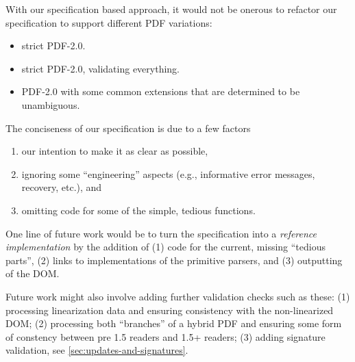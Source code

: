With our specification based approach, it would not be onerous
to refactor our specification to support different PDF variations:
\begin{itemize}
\item strict PDF-2.0.
\item strict PDF-2.0, validating everything.
\item PDF-2.0 with some common extensions that are determined to be unambiguous.
\end{itemize}

The conciseness of our specification is due to a few factors
\begin{enumerate}
\item our intention to make it as clear as possible,
\item ignoring some ``engineering'' aspects (e.g., informative error
   messages, recovery, etc.), and
\item omitting code for some of the simple, tedious functions.
\end{enumerate}
One line of future work would be to turn the specification into a
\emph{reference implementation} by the addition of
(1) code for the current, missing ``tedious parts'',
(2) links to implementations of the primitive parsers, and
(3) outputting of the DOM.

Future work might also involve adding further validation checks such as these:
(1) processing linearization data and ensuring consistency with the
non-linearized DOM;
(2) processing both ``branches'' of a hybrid PDF and ensuring
some form of constency between pre 1.5 readers and 1.5+ readers;
(3) adding signature validation, see \cref{sec:updates-and-signatures}.


\iffalse
\begin{code}

trailersConsistentAcrossUpdates :: [Update] -> Bool
trailersConsistentAcrossUpdates = stub

-- signatures above:
removeFrees m = M.mapMaybe
                  (\x -> case x of Right y -> Just y
                                   _       -> Nothing)
                  m
thawXRefEntry = notImplementedYet
getObjIds = notImplementedYet

\end{code}
\fi
